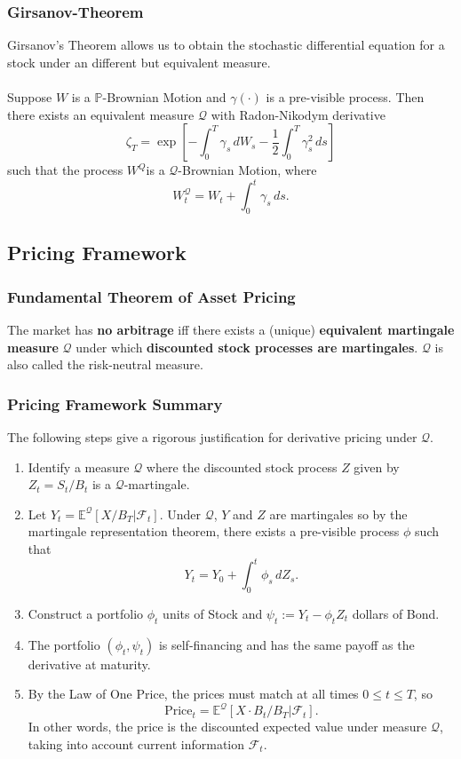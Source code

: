 \documentclass[11pt]{article}
\newcommand{\E}{\mathbb{E}}
\newcommand{\F}{\mathcal{F}}
\newcommand{\PR}{\mathbb{P}}
\newcommand{\Q}{\mathcal{Q}}
\begin{document}
	\subsubsection{Girsanov-Theorem}
	Girsanov's Theorem allows us to obtain the stochastic differential equation for a stock under an different but equivalent measure.\\\\
	Suppose \( W \) is a \( \PR \)-Brownian Motion and \( \gamma(\cdot) \) is a pre-visible process. Then there exists an equivalent measure \( \Q \) with Radon-Nikodym derivative 
	\[	\zeta_T = \exp\left[-\int_{0}^{T}\gamma_s\, dW_s - \frac{1}{2}\int_{0}^{T}\gamma_s^2 \, ds\right]
		\]
	such that the process \( W^{Q} \)is a \( \Q \)-Brownian Motion, where
	\[	W^{\Q}_t = W_t + \int_{0}^{t} \gamma_s\, ds.\]
	\subsection{Pricing Framework}
	\subsubsection{Fundamental Theorem of Asset Pricing}
	The market has \textbf{no arbitrage} iff there exists a (unique) \textbf{equivalent martingale measure} \( \Q \) under which \textbf{discounted stock processes are martingales}. \( \Q \) is also called the risk-neutral measure.
	\subsubsection{Pricing Framework Summary}
	The following steps give a rigorous justification for derivative pricing under \( \Q \).
	\begin{enumerate}
		\item Identify a measure \( \Q \) where the discounted stock process \( Z \) given by \( Z_t = S_t/B_t \) is a \( \Q \)-martingale.
		\item Let \( Y_t = \E^{\Q}\left[X/B_T|\mathcal{F}_t\right] \). Under \( \Q \), \( Y \) and \( Z \) are martingales so by the martingale representation theorem, there exists a pre-visible process \( \phi \) such that
		\[	Y_t = Y_0 + \int_{0}^{t}\phi_s\, dZ_s.
		   \]
		\item Construct a portfolio \( \phi_t \) units of Stock and \( \psi_t := Y_t - \phi_t Z_t \) dollars of Bond.
		\item The portfolio \( (\phi_t, \psi_t) \) is self-financing and has the same payoff as the derivative at maturity.
		\item By the Law of One Price, the prices must match at all times \( 0\leq t\leq T \), so
		\[	\text{Price}_t = \E^{\Q}[X \cdot B_t/B_T|\F_t].
			\]
		 In other words, the price is the discounted expected value under measure \( \Q \), taking into account current information \( \F_t \).
	\end{enumerate}
\end{document}
